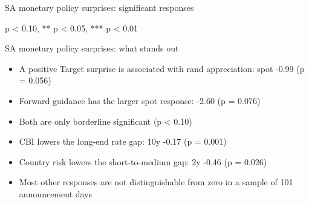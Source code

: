 \documentclass[
  ignorenonframetext,
  aspectratio=141,
]{beamer}
\providecommand{\tightlist}{%
  \setlength{\itemsep}{0pt}\setlength{\parskip}{0pt}}\usepackage{longtable,booktabs,array}
\begin{document}
\begin{frame}{SA monetary policy surprises: significant responses}
\label{sa-monetary-policy-surprises-significant-responses}
\begin{table}[!h]
\centering\begingroup\fontsize{9}{11}\selectfont

\endgroup{}
\end{table}

\vspace{0.2cm}

\footnotesize * p \textless{} 0.10, ** p \textless{} 0.05, *** p
\textless{} 0.01
\end{frame}

\begin{frame}{SA monetary policy surprises: what stands out}
\label{sa-monetary-policy-surprises-what-stands-out}
\begin{itemize}
\tightlist
\item
  A positive Target surprise is associated with rand appreciation: spot
  -0.99 (p = 0.056)
\item
  Forward guidance has the larger spot response: -2.60 (p = 0.076)
\item
  Both are only borderline significant (p \textless{} 0.10)
\item
  CBI lowers the long-end rate gap: 10y -0.17 (p = 0.001)
\item
  Country risk lowers the short-to-medium gap: 2y -0.46 (p = 0.026)
\item
  Most other responses are not distinguishable from zero in a sample of
  101 announcement days
\end{itemize}
\end{frame}
\end{document}
